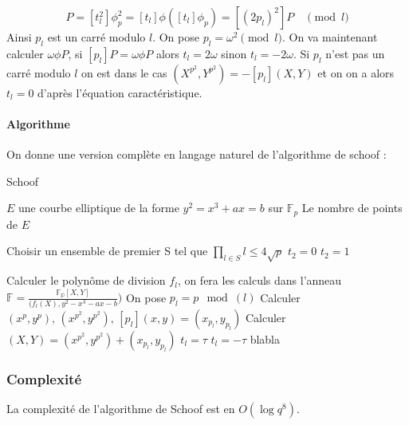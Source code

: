 \documentclass{article}
\begin{document}
\begin{equation}
[t_l^2 p_l]P = [t_l^2] \phi_p^2 = [t_l] \phi ([t_l] \phi_p) = [(2p_l)^2]P \quad \pmod{l}
\end{equation}
Ainsi $p_l$ est un carré modulo $l$. On pose $p_l = \omega^2 \pmod{l}$. On va maintenant calculer $\omega \phi P$, si $[p_l]P = \omega \phi P$ alors $t_l = 2\omega$ sinon $t_l = -2\omega$.
\newline
\medskip
Si $p_l$ n'est pas un carré modulo $l$ on est dans le cas $(X^{p^2}, Y^{p^2}) = - [p_l](X,Y)$ et on on a alors $t_l = 0$ d'après l'équation caractéristique. 

\paragraph{Algorithme}
On donne une version complète en langage naturel de l'algorithme de schoof : 

\begin{algorithm}
\caption{Schoof}
\begin{algorithmic}
\REQUIRE $E$ une courbe elliptique de la forme $y^2 = x^3 + ax = b$ sur $\mathbb{F}_p$
\ENSURE Le nombre de points de $E$

\STATE Choisir un ensemble de premier S tel que $\prod_{l \in S}l \leq 4\sqrt{p}$
\STATE $t_2 = 0$
\ELSE
\STATE $t_2 = 1$
\ENDIF

\STATE Calculer le polynôme de division $f_l$, on fera les calculs dans l'anneau $\mathbb{F}= \frac{\mathbb{F_p}[X,Y]}{(f_l(X), y^2 -x^3 - ax - b})$
\STATE On pose $p_l = p \mod(l)$
\STATE Calculer $(x^p, y^p), \, (x^{p^2}, y^{p^2}), \, [p_l](x, y) = (x_{p_l}, y_{p_l})$
\STATE Calculer $(X, Y) = (x^{p^2}, y^{p^2}) + (x_{p_l}, y_{p_l})$
\STATE $t_l = \tau$
\ELSE 
\STATE $t_l = - \tau$
\ENDIF
\ENDIF
\ENDFOR
\ELSE
{}
\STATE blabla
\ENDIF
\ENDIF
\ENDFOR
\end{algorithmic}
\end{algorithm}




\subsubsection{Complexité}
La complexité de l'algorithme de Schoof est en $O(\log{q}^8)$. 
\end{document}
